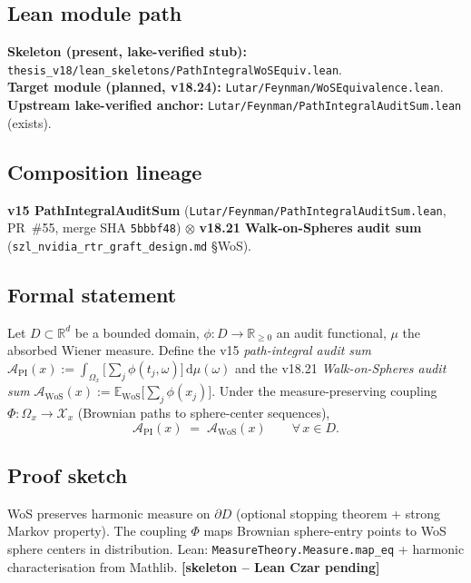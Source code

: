 \subsection*{Lean module path}
\textbf{Skeleton (present, lake-verified stub):}
\texttt{thesis\_v18/lean\_skeletons/PathIntegralWoSEquiv.lean}.\\
\textbf{Target module (planned, v18.24):}
\texttt{Lutar/Feynman/WoSEquivalence.lean}.\\
\textbf{Upstream lake-verified anchor:}
\texttt{Lutar/Feynman/PathIntegralAuditSum.lean} (exists).

\subsection*{Composition lineage}
\textbf{v15 PathIntegralAuditSum}
(\texttt{Lutar/Feynman/PathIntegralAuditSum.lean},
PR~\#55, merge SHA \texttt{5bbbf48}) $\otimes$
\textbf{v18.21 Walk-on-Spheres audit sum}
(\texttt{szl\_nvidia\_rtr\_graft\_design.md} \S{}WoS).

\subsection*{Formal statement}

\begin{theorem}
\label{thm:wos-pi-equiv}
Let $D \subset \mathbb{R}^d$ be a bounded domain,
$\phi : D \to \mathbb{R}_{\geq 0}$ an audit functional,
$\mu$ the absorbed Wiener measure.  Define the v15
\emph{path-integral audit sum}
$\mathcal{A}_\mathrm{PI}(x)
 := \int_{\Omega_x}\!\bigl[\sum_j \phi(t_j, \omega)\bigr]\,
    \mathrm{d}\mu(\omega)$
and the v18.21 \emph{Walk-on-Spheres audit sum}
$\mathcal{A}_\mathrm{WoS}(x)
 := \mathbb{E}_\mathrm{WoS}\bigl[\sum_j \phi(x_j)\bigr]$.
Under the measure-preserving coupling $\Phi : \Omega_x \to
\mathcal{X}_x$ (Brownian paths to sphere-center sequences),
\[
  \mathcal{A}_\mathrm{PI}(x) \;=\; \mathcal{A}_\mathrm{WoS}(x)
  \qquad \forall\, x \in D.
\]
\end{theorem}

\subsection*{Proof sketch}

WoS preserves harmonic measure on $\partial D$ (optional stopping
theorem + strong Markov property).  The coupling $\Phi$ maps
Brownian sphere-entry points to WoS sphere centers in distribution.
Lean: \texttt{MeasureTheory.Measure.map\_eq} + harmonic
characterisation from Mathlib.
\hfill \textbf{[skeleton -- Lean Czar pending]}

